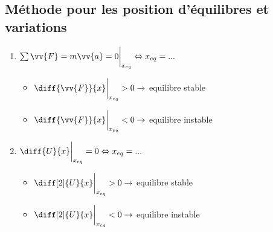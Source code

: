 \documentclass[landscape,a4paper]{article}
\newcommand{\F}{\ensuremath{\vv{F}}}
\newcommand{\ac}{\ensuremath{\vv{a}}}
\newcommand{\eva}{\bigg|}
\newcommand{\ux}{\ensuremath{\vv{u}_x}}
\begin{document}
\begin{multicols}{4}
  \subsection{Méthode pour les position d'équilibres et variations}
  \begin{enumerate}
    \item \( \sum\F = m\ac = 0 \eva_{x_{eq}} \Leftrightarrow x_{eq} = ... \)
      \begin{itemize}
        \item \( \diff{\F}{x}\eva_{x_{eq}} > 0 \rightarrow \) equilibre stable
        \item \( \diff{\F}{x}\eva_{x_{eq}} < 0 \rightarrow \) equilibre instable
      \end{itemize}
    \item \( \diff{U}{x}\eva_{x_{eq}} = 0  \Leftrightarrow x_{eq} = ... \)
      \begin{itemize}
        \item \( \diff[2]{U}{x}\eva_{x_{eq}} > 0 \rightarrow \) equilibre stable
        \item \( \diff[2]{U}{x}\eva_{x_{eq}} < 0 \rightarrow \) equilibre instable
      \end{itemize}
  \end{enumerate}


\end{multicols}
\end{document}
